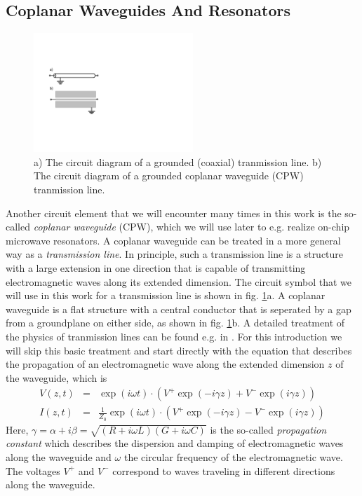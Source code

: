 \subsection{Coplanar Waveguides And Resonators}

\begin{figure}
	\includegraphics[width=6cm]{"./material/figures/introduction/transmission_lines"}
	\caption{a) The circuit diagram of a grounded (coaxial) tranmission line. b) The circuit diagram of a grounded coplanar waveguide (CPW) tranmission line.}
	\label{fig:tline_schematic}
\end{figure}

Another circuit element that we will encounter many times in this work is the so-called {\it coplanar waveguide} (CPW), which we will use later to e.g. realize on-chip microwave resonators. A coplanar waveguide can be treated in a more general way as a {\it transmission line}. In principle, such a transmission line is a structure with a large extension in one direction that is capable of transmitting electromagnetic waves along its extended dimension. The circuit symbol that we will use in this work for a transmission line is shown in fig. \ref{fig:tline_schematic}a. A coplanar waveguide is a flat structure with a central conductor that is seperated by a gap from a groundplane on either side, as shown in fig. \ref{fig:tline_schematic}b. A detailed treatment of the physics of tranmission lines can be found e.g. in \cite{pozar_microwave_2011}. For this introduction we will skip this basic treatment and start directly with the equation that describes the propagation of an electromagnetic wave along the extended dimension $z$ of the waveguide, which is
%
\begin{eqnarray}
V(z,t) & = & \exp{\left(i\omega t\right)}\cdot\left(V^+ \exp{\left(-i\gamma z\right)}+V^-\exp{\left(i\gamma z\right)}\right) \\
I(z,t) & = & \frac{1}{Z_0}\exp{\left(i\omega t\right)}\cdot\left(V^+ \exp{\left(-i\gamma z\right)}-V^-\exp{\left(i\gamma z\right)}\right)
\end{eqnarray}
%
Here, $\gamma = \alpha+i\beta = \sqrt{(R+i\omega L)(G+i\omega C)}$ is the so-called {\it propagation constant} which describes the dispersion and damping of electromagnetic waves along the waveguide and $\omega$ the circular frequency of the electromagnetic wave. The voltages $V^+$ and $V^-$ correspond to waves traveling in different directions along the waveguide.

